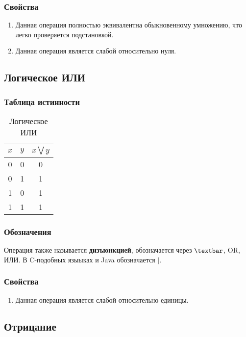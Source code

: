 \subsubsection{Свойства}
\begin{enumerate}
	\item Данная операция полностью эквивалентна обыкновенному умножению, что легко проверяется подстановкой.
	\item Данная операция является слабой относительно нуля.
\end{enumerate}

\subsection{Логическое ИЛИ}
\subsubsection{Таблица истинности}
\begin{table}[H]
	\begin{center}
		\begin{tabular}{|c|c|c|}
			\hline
			$x$ & $y$ & $x\bigvee y$\\
			\hline
			0 & 0 & 0\\
			\hline
			0 & 1 & 1\\
			\hline
			1 & 0 & 1\\
			\hline
			1 & 1 & 1\\
			\hline
		\end{tabular}
		\caption{Логическое ИЛИ}
	\end{center}
\end{table}

\subsubsection{Обозначения}
Операция также называется \textbf{дизъюнкцией}, обозначается через $\textbar$, OR, ИЛИ. В C-подобных языыках и Java обозначается $|$.

\subsubsection{Свойства}
\begin{enumerate}
	\item Данная операция является слабой относительно единицы.
\end{enumerate}

\subsection{Отрицание}
